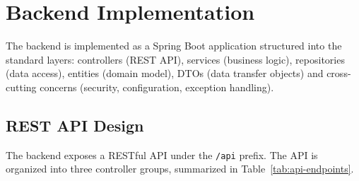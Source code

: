 \section{Backend Implementation}
\label{sec:backend-impl}

 \par The backend is implemented as a Spring Boot application structured into the standard layers: controllers (REST API), services (business logic), repositories (data access), entities (domain model), DTOs (data transfer objects) and cross-cutting concerns (security, configuration, exception handling).

\subsection{REST API Design}
\label{subsec:rest-api}

 \par The backend exposes a RESTful API \cite{Fielding2000} under the \texttt{/api} prefix. The API is organized into three controller groups, summarized in Table~\ref{tab:api-endpoints}.

